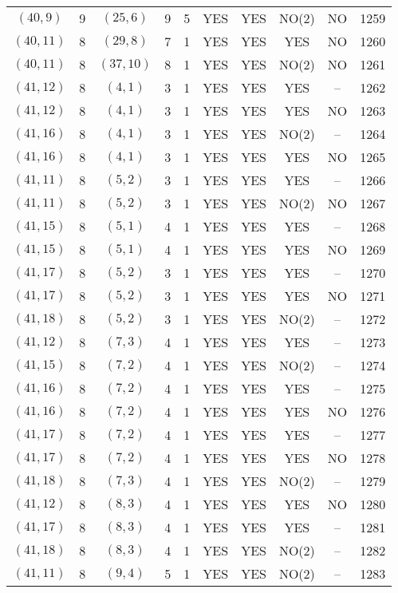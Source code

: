 \begin{longtable}{|c|c|c|c|c|c|c|c|c|c|}
$(40, 9)$ & 9 & $(25, 6)$ & 9 & 5 & YES & YES & NO(2) & NO & 1259\\
$(40, 11)$ & 8 & $(29, 8)$ & 7 & 1 & YES & YES & YES & NO & 1260\\
$(40, 11)$ & 8 & $(37, 10)$ & 8 & 1 & YES & YES & NO(2) & NO & 1261\\
$(41, 12)$ & 8 & $(4, 1)$ & 3 & 1 & YES & YES & YES & -- & 1262\\
$(41, 12)$ & 8 & $(4, 1)$ & 3 & 1 & YES & YES & YES & NO & 1263\\
$(41, 16)$ & 8 & $(4, 1)$ & 3 & 1 & YES & YES & NO(2) & -- & 1264\\
$(41, 16)$ & 8 & $(4, 1)$ & 3 & 1 & YES & YES & YES & NO & 1265\\
$(41, 11)$ & 8 & $(5, 2)$ & 3 & 1 & YES & YES & YES & -- & 1266\\
$(41, 11)$ & 8 & $(5, 2)$ & 3 & 1 & YES & YES & NO(2) & NO & 1267\\
$(41, 15)$ & 8 & $(5, 1)$ & 4 & 1 & YES & YES & YES & -- & 1268\\
$(41, 15)$ & 8 & $(5, 1)$ & 4 & 1 & YES & YES & YES & NO & 1269\\
$(41, 17)$ & 8 & $(5, 2)$ & 3 & 1 & YES & YES & YES & -- & 1270\\
$(41, 17)$ & 8 & $(5, 2)$ & 3 & 1 & YES & YES & YES & NO & 1271\\
$(41, 18)$ & 8 & $(5, 2)$ & 3 & 1 & YES & YES & NO(2) & -- & 1272\\
$(41, 12)$ & 8 & $(7, 3)$ & 4 & 1 & YES & YES & YES & -- & 1273\\
$(41, 15)$ & 8 & $(7, 2)$ & 4 & 1 & YES & YES & NO(2) & -- & 1274\\
$(41, 16)$ & 8 & $(7, 2)$ & 4 & 1 & YES & YES & YES & -- & 1275\\
$(41, 16)$ & 8 & $(7, 2)$ & 4 & 1 & YES & YES & YES & NO & 1276\\
$(41, 17)$ & 8 & $(7, 2)$ & 4 & 1 & YES & YES & YES & -- & 1277\\
$(41, 17)$ & 8 & $(7, 2)$ & 4 & 1 & YES & YES & YES & NO & 1278\\
$(41, 18)$ & 8 & $(7, 3)$ & 4 & 1 & YES & YES & NO(2) & -- & 1279\\
$(41, 12)$ & 8 & $(8, 3)$ & 4 & 1 & YES & YES & YES & NO & 1280\\
$(41, 17)$ & 8 & $(8, 3)$ & 4 & 1 & YES & YES & YES & -- & 1281\\
$(41, 18)$ & 8 & $(8, 3)$ & 4 & 1 & YES & YES & NO(2) & -- & 1282\\
$(41, 11)$ & 8 & $(9, 4)$ & 5 & 1 & YES & YES & NO(2) & -- & 1283\\

\end{longtable}
